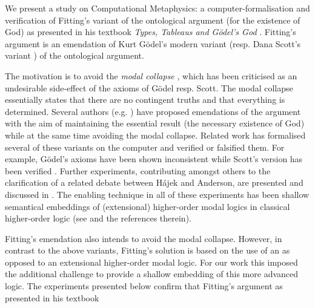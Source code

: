 %
\begin{isabellebody}%
%
%
\isadelimtheory
%
\endisadelimtheory
%
\isatagtheory
%
\endisatagtheory
{\isafoldtheory}%
%
\isadelimtheory
%
\endisadelimtheory
%
\isamarkuptrue%
%
\begin{isamarkuptext}%
We present a study on Computational Metaphysics: a computer-formalisation and verification
of Fitting's variant of the ontological argument (for the existence of God) as presented in
his textbook \emph{Types, Tableaus and G\"odel's God} \cite{Fitting}. Fitting's argument 
is an emendation of Kurt G\"odel's modern variant \cite{GoedelNotes} (resp. Dana Scott's 
variant \cite{ScottNotes}) of the ontological argument.%
\end{isamarkuptext}\isamarkuptrue%
%
\begin{isamarkuptext}%
The motivation is to avoid the \emph{modal collapse} \cite{Sobel,sobel2004logic}, which has been criticised
as an undesirable side-effect of the axioms of G\"odel resp. Scott. The modal collapse essentially  
states that  there are no contingent truths and that everything is determined.
Several authors (e.g. \cite{anderson90:_some_emend_of_goedel_ontol_proof,AndersonGettings,Hajek2002,bjordal99}) 
have proposed emendations of the argument with the aim of maintaining the essential result 
(the necessary existence of God) while at the same time avoiding the modal collapse. 
Related work  has formalised several of these variants on the computer and verified or falsified them. For example,
G\"odel's axioms \cite{GoedelNotes} have been shown inconsistent \cite{C55,C60}
while Scott's version has been verified \cite{ECAI}. Further experiments, contributing amongst others
to the clarification of a related debate between H\'ajek and Anderson, are presented and discussed in
\cite{J23}. The enabling technique in all of these experiments has been
shallow semantical embeddings of (extensional) higher-order modal logics in classical higher-order
logic (see \cite{J23,R59} and the references therein).%
\end{isamarkuptext}\isamarkuptrue%
%
\begin{isamarkuptext}%
Fitting's emendation also intends to avoid the modal collapse. However, in contrast to the above variants, Fitting's
solution is based on the use of an as opposed to an extensional higher-order modal logic.
For our work this imposed the additional challenge to provide a shallow embedding of this more advanced
logic. The experiments presented below confirm that Fitting's argument as presented in his textbook \cite{Fitting}

\end{isamarkuptext}
\end{isabellebody}
